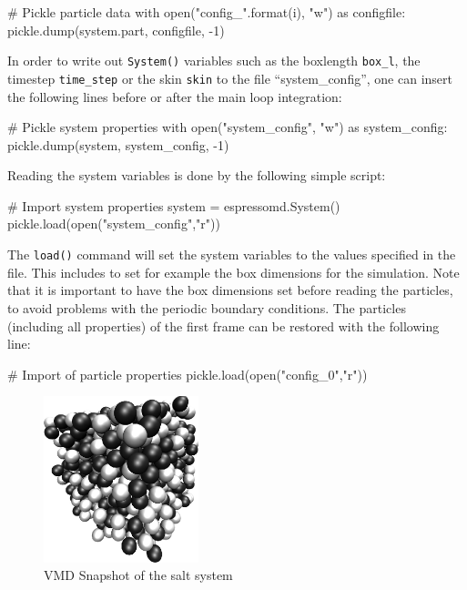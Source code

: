 \documentclass[
a4paper,                        %
11pt,                           %
twoside,                        %
footsepline,                    %
headsepline,                    %
headexclude,                    %
footexclude,                    %
pagesize,                       %
]{scrartcl}
\begin{document}
\begin{tclcode}
    # Pickle particle data
    with open("config_{}".format(i), "w") as configfile:
        pickle.dump(system.part, configfile, -1)
\end{tclcode}

In order to write out \verb|System()| variables such as the boxlength 
\verb|box_l|, the timestep \verb|time_step| or the skin \verb|skin| to the 
file ``system\_config'', one can insert the following lines before or after the 
main loop integration:

\begin{tclcode}
# Pickle system properties
with open("system_config", "w") as system_config:
    pickle.dump(system, system_config, -1)
\end{tclcode}


Reading the system variables is done by the following simple script:

\begin{tclcode}
# Import system properties
system = espressomd.System()
pickle.load(open("system_config","r"))
\end{tclcode}

The \verb|load()| command will set the system variables
to the values specified in the file. This includes to set for example 
the box dimensions for the simulation. Note that it is important to have the box 
dimensions set before reading the particles, to avoid problems with the periodic 
boundary conditions. The particles (including all properties) of the first 
frame can be restored with the following line:

\begin{tclcode}
# Import of particle properties
pickle.load(open("config_0","r"))
\end{tclcode}


\begin{figure}[tb]
  \centering
  \includegraphics[width=0.4\textwidth]{figures/salt}
  \caption{VMD Snapshot of the salt system}
  \label{fig:snapshot}
\end{figure}
\end{document}

